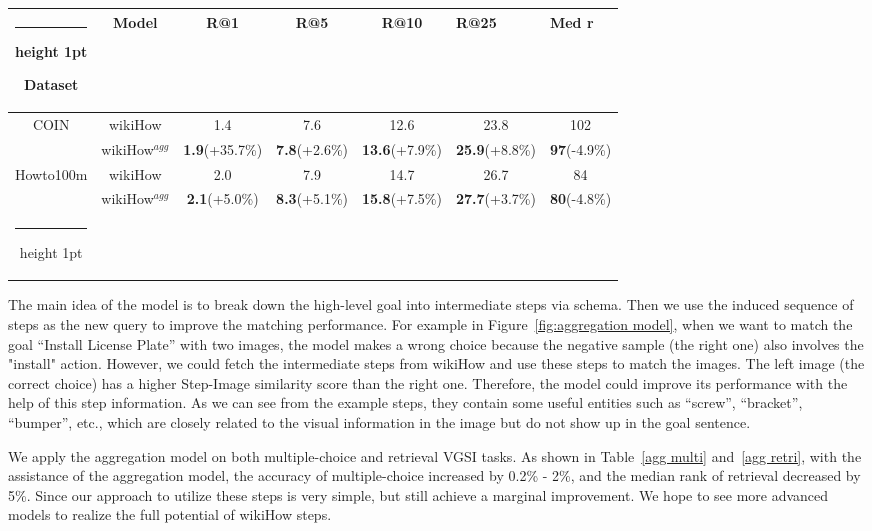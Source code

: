 \documentclass[11pt]{article}
\makeatletter
\newcommand{\thickhline}{\noalign {\ifnum 0=`}\fi \hrule height 1pt
    \futurelet \reserved@a \@xhline
}
\makeatother
\begin{document}
\begin{table*}[!t]
\begin{tabular}{c|c|ccccc}
\thickhline
\textbf{Dataset}                    & \textbf{Model}   & \textbf{R@1}          & \textbf{R@5}         & \textbf{R@10}         & \multicolumn{1}{l}{\textbf{R@25}} & \multicolumn{1}{l}{\textbf{Med r}} \\ \hline
\multirow{2}{*}{COIN}      & wikiHow & 1.4          & 7.6         & 12.6         & 23.8                     & 102                       \\
                           & wikiHow$^{agg}$ & \textbf{1.9}(+35.7\%) & \textbf{7.8}(+2.6\%) & \textbf{13.6}(+7.9\%) & \textbf{25.9}(+8.8\%)             & \textbf{97}(-4.9\%)                \\ \hline \hline
\multirow{2}{*}{Howto100m} & wikiHow & 2.0          & 7.9         & 14.7         & 26.7                     & 84                        \\
                           & wikiHow$^{agg}$ & \textbf{2.1}(+5.0\%)  & \textbf{8.3}(+5.1\%) & \textbf{15.8}(+7.5\%) & \textbf{27.7}(+3.7\%)             & \textbf{80}(-4.8\%)                \\ \thickhline
\end{tabular}
\caption{Apply Step-Aggregation model on retrieval VGSI.}
\label{agg retri}
\end{table*}

The main idea of the model is to break down the high-level goal into intermediate steps via schema. Then we use the induced sequence of steps as the new query to improve the matching performance. For example in Figure~\ref{fig:aggregation model}, when we want to match the goal “Install License Plate” with two images, the model makes a wrong choice because the negative sample (the right one) also involves the "install" action. However, we could fetch the intermediate steps from \textcolor{outerspace}{wiki}\textcolor{OLIVINE}{How} and use these steps to match the images. The left image (the correct choice) has a higher Step-Image similarity score than the right one. Therefore, the model could improve its performance with the help of this step information. As we can see from the example steps, they contain some useful entities such as “screw”, “bracket”, “bumper”, etc., which are closely related to the visual information in the image but do not show up in the goal sentence.

We apply the aggregation model on both multiple-choice and retrieval VGSI tasks. As shown in Table~\ref{agg multi} and~\ref{agg retri}, with the assistance of the aggregation model, the accuracy of multiple-choice increased by 0.2\% - 2\%, and the median rank of retrieval decreased by 5\%. Since our approach to utilize these steps is very simple, but still achieve a marginal improvement. We hope to see more advanced models to realize the full potential of wikiHow steps.
\end{document}
